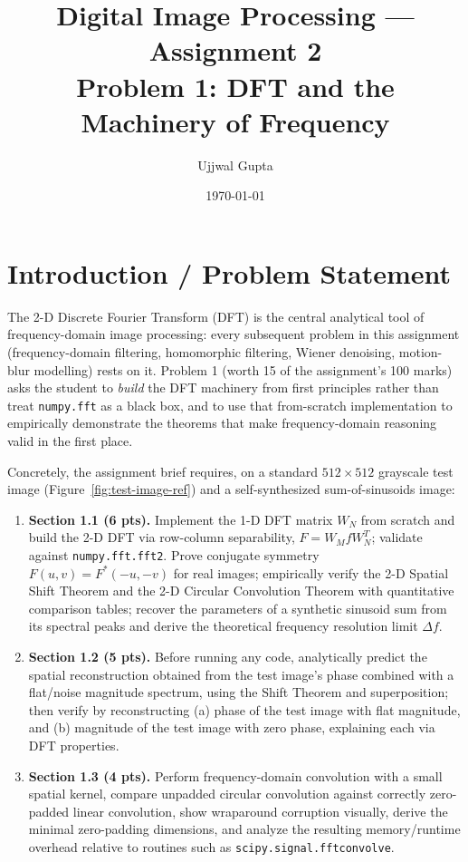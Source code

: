\documentclass[11pt]{article}
\title{\textbf{Digital Image Processing --- Assignment 2}\\[0.3em]\large Problem 1: DFT and the Machinery of Frequency}
\author{Ujjwal Gupta}
\date{\today}
\begin{document}
\maketitle
\tableofcontents
\vspace{1em}

\section{Introduction / Problem Statement}

The 2-D Discrete Fourier Transform (DFT) is the central analytical tool of frequency-domain
image processing: every subsequent problem in this assignment (frequency-domain filtering,
homomorphic filtering, Wiener denoising, motion-blur modelling) rests on it. Problem 1
(worth 15 of the assignment's 100 marks) asks the student to \emph{build} the DFT machinery
from first principles rather than treat \texttt{numpy.fft} as a black box, and to use that
from-scratch implementation to empirically demonstrate the theorems that make frequency-domain
reasoning valid in the first place.

Concretely, the assignment brief requires, on a standard $512\times512$ grayscale test image
(Figure~\ref{fig:test-image-ref}) and a self-synthesized sum-of-sinusoids image:
\begin{enumerate}[label=(\arabic*)]
  \item \textbf{Section 1.1 (6 pts).} Implement the 1-D DFT matrix $W_N$ from scratch and build
    the 2-D DFT via row-column separability, $F = W_M f W_N^T$; validate against
    \texttt{numpy.fft.fft2}. Prove conjugate symmetry $F(u,v) = F^*(-u,-v)$ for real images;
    empirically verify the 2-D Spatial Shift Theorem and the 2-D Circular Convolution Theorem
    with quantitative comparison tables; recover the parameters of a synthetic sinusoid sum from
    its spectral peaks and derive the theoretical frequency resolution limit $\Delta f$.
  \item \textbf{Section 1.2 (5 pts).} Before running any code, analytically predict the spatial
    reconstruction obtained from the test image's phase combined with a flat/noise magnitude
    spectrum, using the Shift Theorem and superposition; then verify by reconstructing (a) phase
    of the test image with flat magnitude, and (b) magnitude of the test image with zero phase,
    explaining each via DFT properties.
  \item \textbf{Section 1.3 (4 pts).} Perform frequency-domain convolution with a small spatial
    kernel, compare unpadded circular convolution against correctly zero-padded linear
    convolution, show wraparound corruption visually, derive the minimal zero-padding dimensions,
    and analyze the resulting memory/runtime overhead relative to routines such as
    \texttt{scipy.signal.fftconvolve}.
\end{enumerate}
\end{document}

